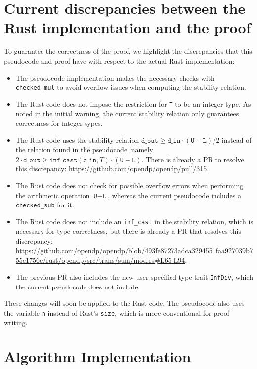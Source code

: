 \documentclass[11pt,a4paper]{article}
\theoremstyle{definition}
\newcommand{\din}{\texttt{d\_in}}
\newcommand{\dout}{\texttt{d\_out}}
\begin{document}
\section{Current discrepancies between the Rust implementation and the proof}

To guarantee the correctness of the proof, we highlight the discrepancies that this pseudocode and proof have with respect to the actual Rust implementation:
\begin{itemize}
    \item The pseudocode implementation makes the necessary checks with \texttt{checked\_mul} to avoid overflow issues when computing the stability relation. 
    \item The Rust code does not impose the restriction for \texttt{T} to be an integer type. As noted in the initial warning, the current stability relation only guarantees correctness for integer types.
    \item The Rust code uses the stability relation $\dout \geq \din \cdot (\texttt{U}-\texttt{L})/2$ instead of the relation found in the pseudocode, namely $2\cdot \dout \geq \texttt{inf\_cast}(\din, T)\cdot (\texttt{U}-\texttt{L})$. There is already a PR to resolve this discrepancy: \url{https://github.com/opendp/opendp/pull/315}.
    \item The Rust code does not check for possible overflow errors when performing the arithmetic operation $\texttt{U}-\texttt{L}$, whereas the current pseudocode includes a \texttt{checked\_sub} for it.
    \item The Rust code does not include an \texttt{inf\_cast} in the stability relation, which is necessary for type correctness, but there is already a PR that resolves this discrepancy: \url{https://github.com/opendp/opendp/blob/493fe87273adca3294551faa927039b755c1756e/rust/opendp/src/trans/sum/mod.rs#L65-L94}.
    \item The previous PR also includes the new user-specified type trait \texttt{InfDiv}, which the current pseudocode does not include.
\end{itemize}

These changes will soon be applied to the Rust code. The pseudocode also uses the variable \texttt{n} instead of Rust's \texttt{size}, which is more conventional for proof writing.


\section{Algorithm Implementation}
\end{document}
